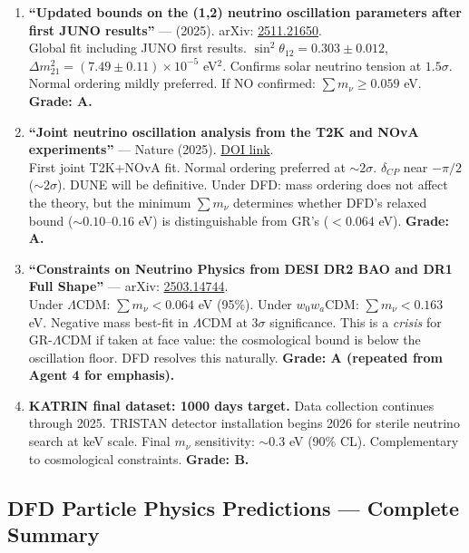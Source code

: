 \documentclass[11pt,a4paper]{article}
\begin{document}
\begin{enumerate}
\item \textbf{``Updated bounds on the (1,2) neutrino oscillation parameters after first JUNO results''} --- (2025). arXiv: \href{https://arxiv.org/abs/2511.21650}{2511.21650}.\\
Global fit including JUNO first results. $\sin^2\theta_{12} = 0.303 \pm 0.012$, $\Delta m^2_{21} = (7.49 \pm 0.11) \times 10^{-5}$ eV$^2$. Confirms solar neutrino tension at $1.5\sigma$. Normal ordering mildly preferred. If NO confirmed: $\sum m_\nu \geq 0.059$ eV. \textbf{Grade: A.}

\item \textbf{``Joint neutrino oscillation analysis from the T2K and NOvA experiments''} --- Nature (2025). \href{https://www.nature.com/articles/s41586-025-09599-3}{DOI link}.\\
First joint T2K+NOvA fit. Normal ordering preferred at $\sim 2\sigma$. $\delta_{CP}$ near $-\pi/2$ ($\sim 2\sigma$). DUNE will be definitive. Under DFD: mass ordering does not affect the theory, but the minimum $\sum m_\nu$ determines whether DFD's relaxed bound ($\sim 0.10$--$0.16$ eV) is distinguishable from GR's ($< 0.064$ eV). \textbf{Grade: A.}

\item \textbf{``Constraints on Neutrino Physics from DESI DR2 BAO and DR1 Full Shape''} --- arXiv: \href{https://arxiv.org/abs/2503.14744}{2503.14744}.\\
Under $\Lambda$CDM: $\sum m_\nu < 0.064$ eV (95\%). Under $w_0w_a$CDM: $\sum m_\nu < 0.163$ eV. Negative mass best-fit in $\Lambda$CDM at $3\sigma$ significance. This is a \emph{crisis} for GR-$\Lambda$CDM if taken at face value: the cosmological bound is below the oscillation floor. DFD resolves this naturally. \textbf{Grade: A (repeated from Agent 4 for emphasis).}

\item \textbf{KATRIN final dataset: 1000 days target.} Data collection continues through 2025. TRISTAN detector installation begins 2026 for sterile neutrino search at keV scale. Final $m_\nu$ sensitivity: $\sim 0.3$ eV (90\% CL). Complementary to cosmological constraints. \textbf{Grade: B.}
\end{enumerate}

\subsection{DFD Particle Physics Predictions --- Complete Summary}
\end{document}

